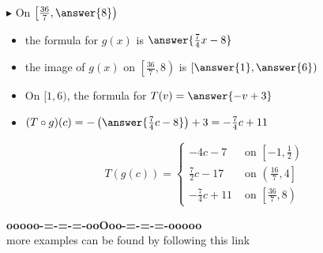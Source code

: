 \documentclass{ximera}
\begin{document}
\begin{explanation}
$\blacktriangleright$ On $\left[ \frac{36}{7}, \answer{8} \right)$



\begin{itemize}

\item the formula for $g(x)$ is $\answer{\frac{7}{4}x - 8}$
\item the image of $g(x)$ on $\left[ \frac{36}{7}, 8 \right)$ is $\left[ \answer{1}, \answer{6} \right)$
\item On $[ 1, 6 )$, the formula for $T(v) = \answer{-v + 3}$  \\
\item $(T \circ g)(c) = -\left(\answer{\frac{7}{4}c - 8}\right) + 3 = -\frac{7}{4}c + 11$ \\


\end{itemize}

































\[
T(g(c)) = 
\begin{cases}
  -4c - 7                &       \text{ on }     \left[-1, \frac{1}{2}\right) \\
  \frac{7}{2}c - 17     &     \text{ on }  \left(\frac{16}{7}, 4\right] \\
  -\frac{7}{4}c + 11   &     \text{ on }  \left[\frac{36}{7}, 8\right)
\end{cases}
\]


  

\end{explanation}





















\begin{center}
\textbf{\textcolor{green!50!black}{ooooo-=-=-=-ooOoo-=-=-=-ooooo}} \\

more examples can be found by following this link\\ 

\end{center}
\end{document}
